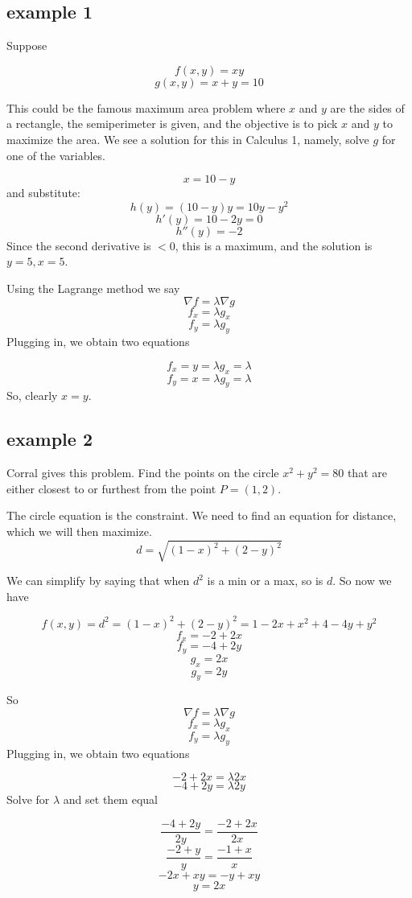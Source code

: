 \documentclass[11pt, oneside]{article}
\begin{document}
\subsection*{example 1}

Suppose

\[ f(x,y) = xy \]
\[ g(x,y) = x + y = 10 \]

This could be the famous maximum area problem where $x$ and $y$ are the sides of a rectangle, the semiperimeter is given, and the objective is to pick $x$ and $y$ to maximize the area.  We see a solution for this in Calculus 1, namely, solve $g$ for one of the variables.

\[ x = 10 - y \]
and substitute:
\[ h(y) = (10-y)y = 10y - y^2 \]
\[ h'(y) = 10 - 2y = 0 \]
\[ h''(y) = - 2 \]
Since the second derivative is $< 0$, this is a maximum, and the solution is $y = 5, x = 5$.

Using the Lagrange method we say
\[ \nabla f = \lambda \nabla g \]
\[ f_x = \lambda g_x \]
\[ f_y = \lambda g_y \]
Plugging in, we obtain two equations

\[ f_x = y = \lambda g_x = \lambda \]
\[ f_y = x = \lambda g_y = \lambda \]
So, clearly $x=y$.

\subsection*{example 2}

Corral gives this problem.  Find the points on the circle $x^2 + y^2 = 80$ that are either closest to or furthest from the point $P = (1,2)$.

The circle equation is the constraint.  We need to find an equation for distance, which we will then maximize.
\[ d = \sqrt{(1-x)^2 + (2-y)^2} \]

We can simplify by saying that when $d^2$ is a min or a max, so is $d$.  So now we have

\[ f(x,y) = d^2 = (1-x)^2 + (2-y)^2 = 1 - 2x + x^2 + 4 - 4y + y^2 \]
\[ f_x = -2 + 2x \]
\[ f_y = -4 + 2y \]
\[ g_x = 2x \]
\[ g_y = 2y \]

So 
\[ \nabla f = \lambda \nabla g \]
\[ f_x = \lambda g_x \]
\[ f_y = \lambda g_y \]
Plugging in, we obtain two equations

\[ -2 + 2x = \lambda 2x \]
\[ -4 + 2y = \lambda 2y \]
Solve for $\lambda$ and set them equal

\[ \frac{-4 + 2y}{2y} = \frac{-2 + 2x}{2x} \]
\[ \frac{-2 + y}{y} = \frac{-1 + x}{x} \]
\[ -2x + xy = -y + xy \]
\[ y = 2x \]
\end{document}
